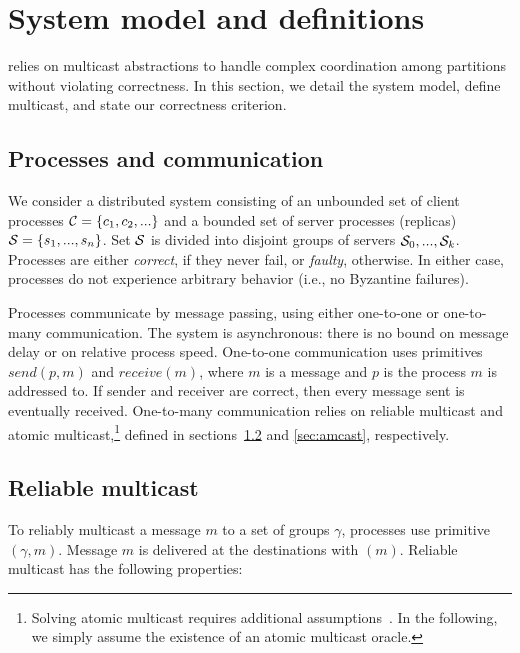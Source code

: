 \section{System model and definitions}
\label{sec:sysmodel}

\dynastar relies on multicast abstractions to handle complex coordination among partitions without violating correctness. 
In this section, we detail the system model, define multicast, and state our correctness criterion. 

\subsection{Processes and communication}

We consider a distributed system consisting of an unbounded set of
client processes $\mathcal{C} = \{c_1, c_2, ...\}$ and a bounded set of
server processes (replicas) $\mathcal{S} = \{s_1, ..., s_n\}$.  Set $\mathcal{S}$ is
divided into disjoint groups of servers $\mathcal{S}_0, ..., \mathcal{S}_k$.
Processes are either \emph{correct}, if they never fail, or
\emph{faulty}, otherwise.  In either case, processes do not experience
arbitrary behavior (i.e., no Byzantine failures).

Processes communicate by message passing, using either one-to-one or
one-to-many communication.  The system is asynchronous: there is no
bound on message delay or on relative process speed.  One-to-one
communication uses primitives $send(p,m)$ and $receive(m)$, where $m$
is a message and $p$ is the process $m$ is addressed to.  If sender
and receiver are correct, then every message sent is eventually
received.
%
One-to-many communication relies on reliable multicast and atomic
multicast,\footnote{Solving atomic multicast requires additional
  assumptions~\cite{CT96,FLP85}. In the following, we simply assume
  the existence of an atomic multicast oracle.}  defined in
sections~\ref{sec:rmcast} and \ref{sec:amcast}, respectively.


\subsection{Reliable multicast}
\label{sec:rmcast}

To reliably multicast a message $m$ to a set of groups $\gamma$,
processes use primitive \rmcast$(\gamma, m)$.  Message $m$ is
delivered at the destinations with \rmdel$(m)$.  Reliable multicast
has the following properties:

